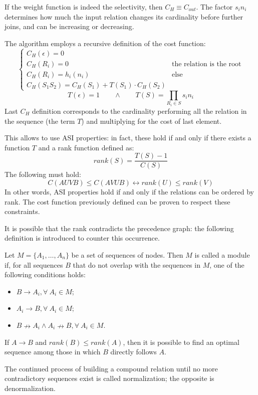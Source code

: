 If the weight function is indeed the selectivity, then $C_H \equiv C_{out}$. The factor $s_in_i$ determines how much the input relation changes its cardinality before further joins, and can be increasing or decreasing.

The algorithm employs a recursive definition of the cost function:
$$\begin{cases}
C_H(\epsilon) = 0 \\
C_H(R_i) = 0 & \text{the relation is the root} \\
C_H(R_i) = h_i(n_i) & \text{else} \\
C_H(S_1S_2) = C_H(S_1) + T(S_1) \cdot C_H(S_2)
\end{cases}$$
$$T(\epsilon) = 1 \qquad \land \qquad T(S) = \prod_{R_i \in S}s_in_i$$
Last $C_H$ definition corresponds to the cardinality performing all the relation in the sequence (the term $T$) and multiplying for the cost of last element.

This allows to use ASI properties: in fact, these hold if and only if there exists a function $T$ and a rank function defined as:
$$rank(S) = \frac{T(S) - 1}{C(S)}$$
The following must hold:
$$C(AUVB) \leq C(AVUB) \leftrightarrow rank(U) \leq rank(V)$$
In other words, ASI properties hold if and only if the relations can be ordered by rank. The cost function previously defined can be proven to respect these constraints.

It is possible that the rank contradicts the precedence graph: the following definition is introduced to counter this occurrence.

Let $M = \{A_1, \dots, A_n\}$ be a set of sequences of nodes. Then $M$ is called a module if, for all sequences $B$ that do not overlap with the sequences in $M$, one of the following conditions holds:
\begin{itemize}
	\item $B \rightarrow A_i, \forall\ A_i \in M$;
	\item $A_i \rightarrow B, \forall\ A_i \in M$;
	\item $B \nrightarrow A_i \land A_i \nrightarrow B, \forall\ A_i \in M$.
\end{itemize}

If $A \rightarrow B$ and $rank(B) \leq rank(A)$, then it is possible to find an optimal sequence among those in which $B$ directly follows $A$.

The continued process of building a compound relation until no more contradictory sequences exist is called normalization; the opposite is denormalization.

